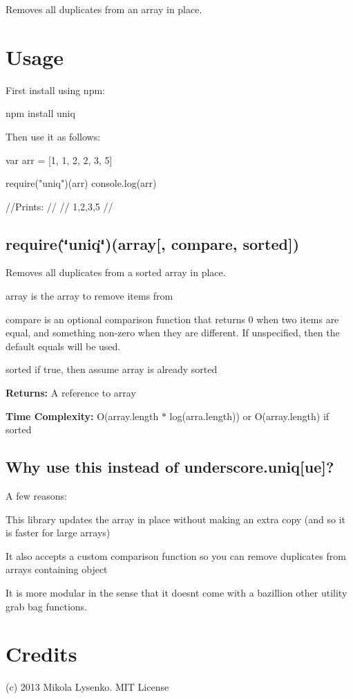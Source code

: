 Removes all duplicates from an array in place.

\section*{Usage }

First install using npm\+: \begin{DoxyVerb}npm install uniq
\end{DoxyVerb}


Then use it as follows\+:


\begin{DoxyCode}
var arr = [1, 1, 2, 2, 3, 5]

require("uniq")(arr)
console.log(arr)

//Prints:
//
//  1,2,3,5
//
\end{DoxyCode}


\subsection*{{\ttfamily require(\char`\"{}uniq\char`\"{})(array\mbox{[}, compare, sorted\mbox{]})}}

Removes all duplicates from a sorted array in place.


\begin{DoxyItemize}
\item {\ttfamily array} is the array to remove items from
\item {\ttfamily compare} is an optional comparison function that returns 0 when two items are equal, and something non-\/zero when they are different. If unspecified, then the default equals will be used.
\item {\ttfamily sorted} if true, then assume array is already sorted
\end{DoxyItemize}

{\bfseries Returns\+:} A reference to {\ttfamily array}

{\bfseries Time Complexity\+:} {\ttfamily O(array.\+length $\ast$ log(arra.\+length))} or {\ttfamily O(array.\+length)} if {\ttfamily sorted}

\subsection*{Why use this instead of underscore.\+uniq\mbox{[}ue\mbox{]}?}

A few reasons\+:


\begin{DoxyItemize}
\item This library updates the array in place without making an extra copy (and so it is faster for large arrays)
\item It also accepts a custom comparison function so you can remove duplicates from arrays containing object
\item It is more modular in the sense that it doesn\textquotesingle{}t come with a bazillion other utility grab bag functions.
\end{DoxyItemize}

\section*{Credits}

(c) 2013 Mikola Lysenko. M\+IT License 